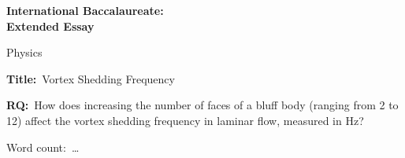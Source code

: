\documentclass[a4paper]{article}
\begin{document}
\begin{titlepage}
    \begin{center}
            {\LARGE \textbf{International Baccalaureate: \\[0.2cm]
            Extended Essay}}
            \vspace{0.6cm}
            
            {\Large Physics}

            \vspace*{4cm}

            {\LARGE\textbf{Title:}\ Vortex Shedding Frequency}
            \vspace{1cm}

            {\Large\textbf{RQ:}\ How does increasing the number of faces of a bluff body (ranging from 2 to 12) affect the vortex shedding frequency in laminar flow, measured in Hz?}
            \vspace{4cm}

            {\large Word count:\ \ldots}
            \vfill

    \end{center}
\end{titlepage}

\tableofcontents

\listoffigures

\listoftables



\printnomenclature















\appendix


\printglossaries

\nocite{*}
\printbibliography
\end{document}
